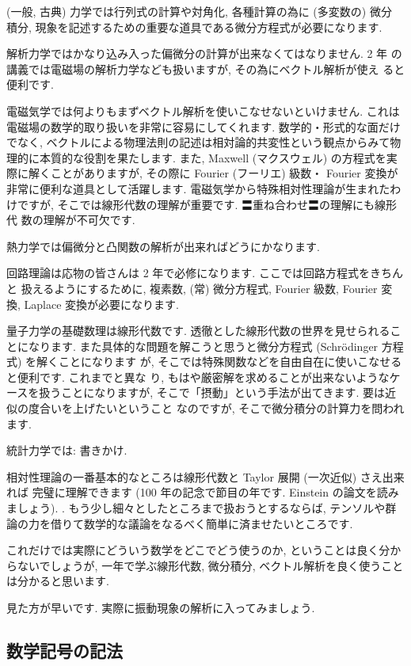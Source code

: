 \documentclass[openany, a4paper, oneside]{jsbook}
\begin{document}
(一般, 古典) 力学では行列式の計算や対角化, 各種計算の為に (多変数の) 微分
積分, 現象を記述するための重要な道具である微分方程式が必要になります.

解析力学ではかなり込み入った偏微分の計算が出来なくてはなりません. 2 年
の講義では電磁場の解析力学なども扱いますが, その為にベクトル解析が使え
ると便利です.

電磁気学では何よりもまずベクトル解析を使いこなせないといけません. これは
電磁場の数学的取り扱いを非常に容易にしてくれます. 数学的・形式的な面だけ
でなく, ベクトルによる物理法則の記述は相対論的共変性という観点からみて物
理的に本質的な役割を果たします. また, Maxwell (マクスウェル) の方程式を実
際に解くことがありますが, その際に Fourier (フーリエ) 級数・ Fourier 変換が
非常に便利な道具として活躍します. 電磁気学から特殊相対性理論が生まれたわ
けですが, そこでは線形代数の理解が重要です. 〓重ね合わせ〓の理解にも線形代
数の理解が不可欠です.

熱力学では偏微分と凸関数の解析が出来ればどうにかなります.

回路理論は応物の皆さんは 2 年で必修になります. ここでは回路方程式をきちんと
扱えるようにするために, 複素数, (常) 微分方程式, Fourier 級数, Fourier 変
換, Laplace 変換が必要になります.

量子力学の基礎数理は線形代数です. 透徹とした線形代数の世界を見せられることになります.
また具体的な問題を解こうと思うと微分方程式 (Schr\"odinger 方程式) を解くことになります
が, そこでは特殊関数などを自由自在に使いこなせると便利です. これまでと異な
り, もはや厳密解を求めることが出来ないようなケースを扱うことになりますが,
そこで「摂動」という手法が出てきます. 要は近似の度合いを上げたいということ
なのですが, そこで微分積分の計算力を問われます.

統計力学では: 書きかけ.

相対性理論の一番基本的なところは線形代数と Taylor 展開 (一次近似) さえ出来れば
完璧に理解できます (100 年の記念で節目の年です. Einstein の論文を読みましょう). .
もう少し細々としたところまで扱おうとするならば,
テンソルや群論の力を借りて数学的な議論をなるべく簡単に済ませたいところです.

これだけでは実際にどういう数学をどこでどう使うのか,
ということは良く分からないでしょうが, 一年で学ぶ線形代数, 微分積分, ベクトル解析を良く使うことは分かると思います.

見た方が早いです.
実際に振動現象の解析に入ってみましょう.
\subsection{数学記号の記法}
\end{document}
